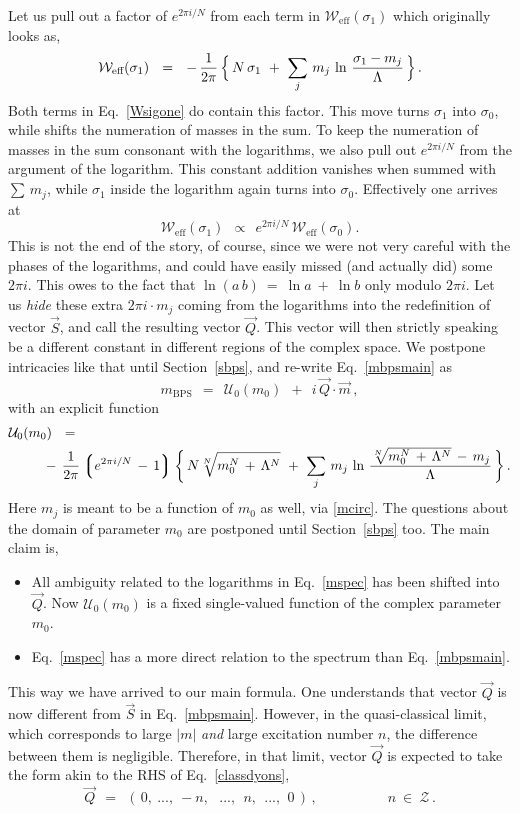 \documentclass[epsfig,12pt]{article}
\def\beq{\begin{equation}}
\def\eeq{\end{equation}}
\def\beq{\begin{equation}}
\def\eeq{\end{equation}}
\newcommand{\mc}[1]{\mathcal{#1}}
\newcommand{\lgr}{\left\lgroup}
\newcommand{\rgr}{\right\rgroup}
\newcommand{\mbps}{m_\text{BPS}}
\newcommand{\W}{\mathcal{W}}
\begin{document}
	Let us pull out a factor of $ e^{2\pi i / N} $ from each term in 
	$ \W_\text{eff} ( \sigma_1 ) $ which originally looks as,
\beq
\label{Wsigone}
	\W_\text{eff} ( \sigma_1 ) ~~=~~ 
		-\, \frac{1}{2\pi}\,  
                \Bigl\{\, N\, \sigma_1 ~+~ \sum_j\, m_j\, \ln \,\frac{\sigma_1 - m_j}{\Lambda} \,\Bigr\}\,.
\eeq
	Both terms in Eq.~\eqref{Wsigone} do contain this factor.
	This move turns $ \sigma_1 $ into $ \sigma_0 $, while shifts the numeration of masses in the sum.
	To keep the numeration of masses in the sum consonant with the logarithms, we also pull out
	$ e^{2\pi i / N} $ from the argument of the logarithm.
	This constant addition vanishes when summed with $ \sum\, m_j $,
	while $ \sigma_1 $ inside the logarithm again turns into $ \sigma_0 $.
	Effectively one arrives at 
\beq
	\W_\text{eff}(\sigma_1) ~~\propto~~ e^{2\pi i / N}\, \W_\text{eff}(\sigma_0).
\eeq
	This is not the end of the story, of course, since we were not very careful with the phases
	of the logarithms, and could have easily missed (and actually did) some $ 2 \pi i $.
	This owes to the fact that $ \ln(a\,b) ~=~ \ln a ~+~ \ln b $ only modulo $ 2\pi i $.
	Let us {\it hide} these extra $ 2\pi i \cdot m_j $ coming from the logarithms into 
	the redefinition of vector $ \vec{S} $, and call the resulting vector $ \vec{Q} $.
	This vector will then strictly speaking be a different constant in different regions of the 
	complex space.
	We postpone intricacies like that until Section~\ref{sbps}, and re-write Eq.~\eqref{mbpsmain} as
\beq
\label{mspec}
	\mbps ~~=~~ \mc{U}_0 (m_0) ~~+~~ i\, \vec{Q} \cdot \vec{m}\,,
\eeq
	with an explicit function
\begin{align}
%
\label{unod}
	\mc{U}_0 (m_0) & ~~=~~ 
	\\
%
\notag
	&\!\!\!\! -\, \frac{1}{2\pi} \lgr e^{2\pi i / N} \,-\, 1 \rgr 
	\biggl\{\, N \sqrt[N] { m_0^N \,+\, \Lambda^N }  ~+~
		\sum_j\, m_j\, \ln \, \frac{ \sqrt[N] { m_0^N \,+\, \Lambda^N } \,-\, m_j } { \Lambda} \,\biggr\}\,.
\end{align}
	Here $ m_j $ is meant to be a function of $ m_0 $ as well, via \eqref{mcirc}. 
	The questions about the domain of parameter $ m_0 $ are postponed until Section~\ref{sbps} too.
	The main claim is,
\begin{itemize}
\item
	All ambiguity related to the logarithms in Eq.~\eqref{mspec} has been shifted into $ \vec{Q} $. 
	Now $ \mc{U}_0(m_0) $ is a fixed single-valued function of the complex parameter $ m_0 $.
\item
	Eq.~\eqref{mspec} has a more direct relation to the spectrum than Eq.~\eqref{mbpsmain}.
\end{itemize}
	This way we have arrived to our main formula.
	One understands that vector $ \vec{Q} $ is now different from $ \vec{S} $ in Eq.~\eqref{mbpsmain}.
	However, in the quasi-classical limit, which corresponds to large $ |m| $ {\it and} 
	large excitation number $ n $, the difference between them is negligible.
	Therefore, in that limit, vector $ \vec{Q} $ is expected to take the form akin to the 
	RHS of Eq.~\eqref{classdyons},
\beq
\label{qclass}
	\vec{Q} ~~=~~ (\, 0,~ ...,~ -n, ~~~...,~~ n,~~ ...,~\, 0\, )\,, 
	\qquad\qquad\quad     n~\in~\mc{Z}\,.
\eeq
\end{document}
